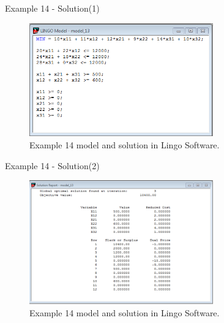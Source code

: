 \begin{frame}{Example 14 - Solution(1)}
\begin{figure}
    \includegraphics[width=300px]{slides/ex14/screenshot_a.png}
    \caption{Example 14 model and solution in Lingo Software.}
\end{figure}
\end{frame}

\begin{frame}{Example 14 - Solution(2)}
\begin{figure}
    \includegraphics[width=300px]{slides/ex14/screenshot_b.png}
    \caption{Example 14 model and solution in Lingo Software.}
\end{figure}
\end{frame}

